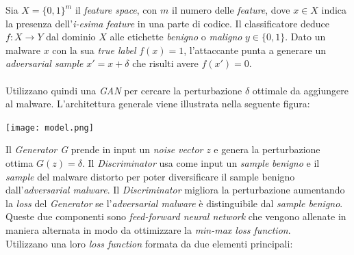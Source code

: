 Sia \(X = \{0, 1\}^m\) il \textit{feature space}, con \(m\) il numero delle \textit{feature}, dove \(x \in X\) indica la presenza dell'\textit{i-esima} \textit{feature} in una parte di codice. Il classificatore deduce \(f : X \to Y\) dal dominio \(X\) alle etichette \textit{benigno} o \textit{maligno} \(y \in \{0, 1\}\). Dato un malware \(x\) con la sua \textit{true label} \(f(x) = 1\), l'attaccante punta a generare un \textit{adversarial sample} \(x' = x + \delta\) che risulti avere  \(f(x') = 0\).\\
\\
Utilizzano quindi una \textit{GAN} per cercare la perturbazione \(\delta\) ottimale da aggiungere al malware. L'architettura generale viene illustrata nella seguente figura:

\texttt{[image: model.png]}

Il \textit{Generator G} prende in input un \textit{noise vector} \(z\) e genera la perturbazione ottima \(G(z) = \delta\).
Il \textit{Discriminator} usa come input un \textit{sample} \textit{benigno} e il \textit{sample} del malware distorto per poter diversificare il sample benigno dall'\textit{adversarial malware}. Il \textit{Discriminator} migliora la perturbazione aumentando la \textit{loss} del \textit{Generator} se l'\textit{adversarial malware} è distinguibile dal \textit{sample benigno}.\\
Queste due componenti sono \textit{feed-forward neural network} che vengono allenate in maniera alternata in modo da ottimizzare la \textit{min-max loss function}.\\
Utilizzano una loro \textit{loss function} formata da due elementi principali:

